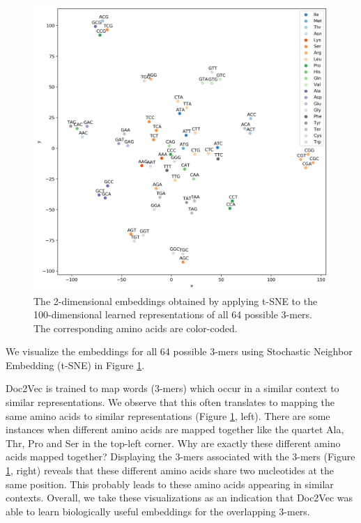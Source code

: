 \begin{figure}
	\includegraphics[width=1\textwidth]{../visualizations/ch4-methods/tsne_d2v_embeddings.png} 	
	\caption{
		The 2-dimensional embeddings obtained by applying t-SNE to the 100-dimensional learned representations of all 64 possible 3-mers. The corresponding amino acids are color-coded. 
	}
	\label{fig:tsne}
\end{figure}

We visualize the embeddings for all 64 possible 3-mers using Stochastic Neighbor Embedding (t-SNE) \cite{tsne} in Figure \ref{fig:tsne}.

Doc2Vec is trained to map words (3-mers) which occur in a similar context to similar representations. We observe that this often translates to mapping the same amino acids to similar representations (Figure \ref{fig:tsne}, left). There are some instances when different amino acids are mapped together like the quartet Ala, Thr, Pro and Ser in the top-left corner. Why are exactly these different amino acids mapped together? Displaying the 3-mers associated with the 3-mers (Figure \ref{fig:tsne}, right) reveals that these different amino acids share two nucleotides at the same position. This probably leads to these amino acids appearing in similar contexts.
Overall, we take these visualizations as an indication that Doc2Vec was able to learn biologically useful embeddings for the overlapping 3-mers.
